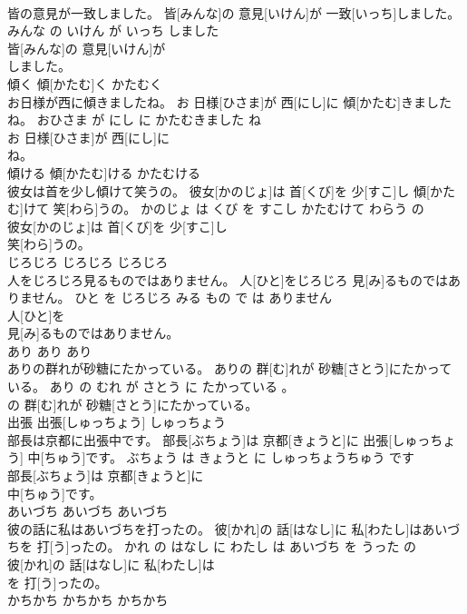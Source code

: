 \documentclass[8pt]{extreport}
\begin{document}
\begin{CJK}{UTF8}{min}
\\	皆の意見が一致しました。	皆[みんな]の 意見[いけん]が 一致[いっち]しました。	みんな の いけん が いっち しました	
\\	皆[みんな]の 意見[いけん]が
\\	しました。			
\\	傾く	傾[かたむ]く	かたむく	
\\	お日様が西に傾きましたね。	お 日様[ひさま]が 西[にし]に 傾[かたむ]きましたね。	おひさま が にし に かたむきました ね	
\\	お 日様[ひさま]が 西[にし]に
\\	ね。			
\\	傾ける	傾[かたむ]ける	かたむける	
\\	彼女は首を少し傾けて笑うの。	彼女[かのじょ]は 首[くび]を 少[すこ]し 傾[かたむ]けて 笑[わら]うの。	かのじょ は くび を すこし かたむけて わらう の	
\\	彼女[かのじょ]は 首[くび]を 少[すこ]し
\\	笑[わら]うの。			
\\	じろじろ	じろじろ	じろじろ	
\\	人をじろじろ見るものではありません。	人[ひと]をじろじろ 見[み]るものではありません。	ひと を じろじろ みる もの で は ありません	
\\	人[ひと]を
\\	見[み]るものではありません。			
\\	あり	あり	あり	
\\	ありの群れが砂糖にたかっている。	ありの 群[む]れが 砂糖[さとう]にたかっている。	あり の むれ が さとう に たかっている 。	
\\	の 群[む]れが 砂糖[さとう]にたかっている。			
\\	出張	出張[しゅっちょう]	しゅっちょう	
\\	部長は京都に出張中です。	部長[ぶちょう]は 京都[きょうと]に 出張[しゅっちょう] 中[ちゅう]です。	ぶちょう は きょうと に しゅっちょうちゅう です	
\\	部長[ぶちょう]は 京都[きょうと]に
\\	中[ちゅう]です。			
\\	あいづち	あいづち	あいづち	
\\	彼の話に私はあいづちを打ったの。	彼[かれ]の 話[はなし]に 私[わたし]はあいづちを 打[う]ったの。	かれ の はなし に わたし は あいづち を うった の	
\\	彼[かれ]の 話[はなし]に 私[わたし]は
\\	を 打[う]ったの。			
\\	かちかち	かちかち	かちかち	

\end{CJK}
\end{document}

